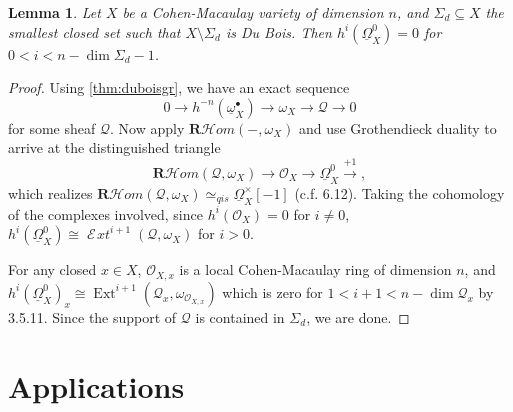\documentclass{report}
\newtheorem{lemma}[theorem]{Lemma}
\theoremstyle{definition}
\DeclareMathOperator{\Ext}{Ext}
\DeclareMathOperator{\cExt}{\mathscr{E} \! \textit{xt}}
\newcommand{\cHom}{\mathcal{H} \textit{om}}
\newcommand{\OO}{\mathcal{O}}
\newcommand{\qis}{\simeq_{qis}}
\newcommand{\bR}{\textbf{R}}
\newcommand{\DB}{\underline{\Omega}}
\newcommand{\db}{\underline{\omega}^\bullet}
\begin{document}
\begin{lemma}
	Let $X$ be a Cohen-Macaulay variety of dimension $n$, and $\Sigma_d \subseteq X$ the smallest closed set such that $X \setminus \Sigma_d$ is Du Bois.
	Then $h^i (\DB_X^0) = 0$ for $0 < i < n - \dim \Sigma_d - 1$.
\end{lemma}
\begin{proof}
	Using \ref{thm:duboisgr}, we have an exact sequence
	\[
		0 \rightarrow h^{-n}(\db_X) \rightarrow \omega_X \rightarrow \mathscr{Q} \rightarrow 0
	\]
	for some sheaf $\mathscr{Q}$.
	Now apply $\bR \cHom (-, \omega_X)$ and use Grothendieck duality to arrive at the distinguished triangle
	\[
		\bR \cHom(\mathscr{Q}, \omega_X) \rightarrow \OO_X \rightarrow \DB_X^0 \xrightarrow{+1},
	\]
	which realizes $\bR \cHom(\mathscr{Q}, \omega_X) \qis \DB_X^\times[-1]$ (c.f. \cite{Kollar2013} 6.12).
	Taking the cohomology of the complexes involved, since $h^i(\OO_X) = 0$ for $i \neq 0$, $h^i(\DB_X^0) \cong \cExt^{i+1}(\mathscr{Q}, \omega_X)$ for $i > 0$.
	
	For any closed $x \in X$, $\OO_{X,x}$ is a local Cohen-Macaulay ring of dimension $n$, and $h^i(\DB_X^0)_x \cong \Ext^{i+1}(\mathscr{Q}_x, \omega_{\OO_{X,x}})$ which is zero for $1 < i+1 < n - \dim \mathscr{Q}_x$ by \cite{Bruns1993} 3.5.11. Since the support of $\mathscr{Q}$ is contained in $\Sigma_d$, we are done.
\end{proof}

\chapter{Applications}
\label{chp:applications}
\end{document}
